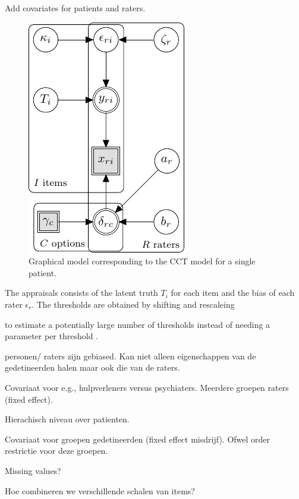 \documentclass{article}
\newcommand{\Irater}{r}
\newcommand{\Iitem}{i}
\begin{document}
Add covariates for patients and raters.
\begin{figure}[!ht]
	\centering
	\includegraphics[width=.6\textwidth, page=3]{graphicalModels/graphicalModels.pdf}
	\caption{Graphical model corresponding to the CCT model for a single patient.}
	\label{model:CCTO3}
\end{figure}
 
 
 

The appraisals consists of the latent truth $T_\Iitem$ for each item and the bias of each rater $\epsilon_\Irater$. The thresholds are obtained by shifting and rescaleing 


to estimate a potentially large number of thresholds instead of needing a parameter per threshold \cite{Fox1995, Gonzalez1999}.


\newpage


personen/ raters zijn gebiased. Kan niet alleen eigenschappen van de gedetineerden halen maar ook die van de raters.

Covariaat voor e.g., hulpverleners versus psychiaters. Meerdere groepen raters (fixed effect).

Hierachisch niveau over patienten.

Covariaat voor groepen gedetineerden (fixed effect misdrijf).
Ofwel order restrictie voor deze groepen.

Missing values?

Hoe combineren we verschillende schalen van items?
\end{document}
